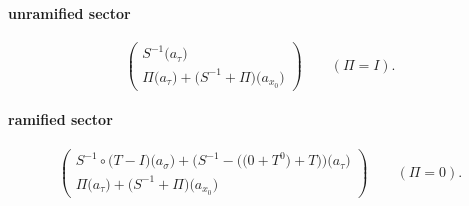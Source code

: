 \paragraph{unramified sector}
\[\begin{pmatrix}S^{-1}\bigl(a_{\tau}\bigr)\\\Pi\bigl(a_{\tau}\bigr)+\bigl(S^{-1}+\Pi\bigr)\bigl(a_{x_{0}}\bigr)\end{pmatrix}\qquad(\Pi=I).\]
\paragraph{ramified sector}
\[\begin{pmatrix}S^{-1}\circ \bigl(T-I\bigr)\bigl(a_{\sigma}\bigr)+\bigl(S^{-1}-\bigl(\bigl(0+T^{0}\bigr)+T\bigr)\bigr)\bigl(a_{\tau}\bigr)\\\Pi\bigl(a_{\tau}\bigr)+\bigl(S^{-1}+\Pi\bigr)\bigl(a_{x_{0}}\bigr)\end{pmatrix}\qquad(\Pi=0).\]

